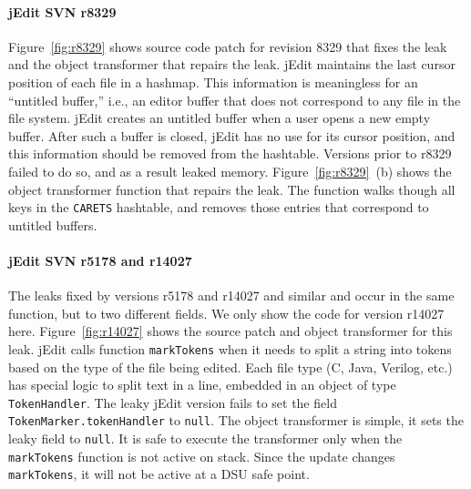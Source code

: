 

\paragraph{jEdit SVN r8329} Figure~\ref{fig:r8329} shows source code patch
for revision 8329 that fixes the leak and the object transformer that
repairs the leak. jEdit maintains the last cursor position of each file in
a hashmap. This information is meaningless for an ``untitled buffer,'' i.e.,
an editor buffer that does not correspond to any file in the file system.
jEdit creates an untitled buffer when a user opens a new empty buffer.
After such a buffer is closed, jEdit has no use for its cursor position,
and this information should be removed from the hashtable. Versions prior
to r8329 failed to do so, and as a result leaked memory.
Figure~\ref{fig:r8329}~(b) shows the object transformer function that
repairs the leak. The function walks though all keys in the {\tt CARETS}
hashtable, and removes those entries that correspond to untitled buffers.



\paragraph{jEdit SVN r5178 and r14027} The leaks fixed by versions r5178
and r14027 and similar and occur in the same function, but to two
different fields. We only show the code for version r14027 here.
Figure~\ref{fig:r14027} shows the source patch and object transformer for
this leak. jEdit calls function {\tt markTokens} when it needs to split a
string into tokens based on the type of the file being edited. Each file
type (C, Java, Verilog, etc.) has special logic to split text in a line,
embedded in an object of type {\tt TokenHandler}. The leaky jEdit version
fails to set the field {\tt TokenMarker.tokenHandler} to {\tt null}. The
object transformer is simple, it sets the leaky field to {\tt null}. It is
safe to execute the transformer only when the {\tt markTokens} function is
not active on stack. Since the update changes {\tt markTokens}, it will not
be active at a DSU safe point.



